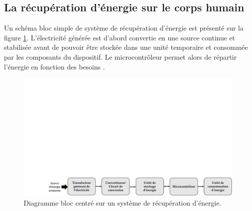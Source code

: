 	\subsection{La récupération d'énergie sur le corps humain}
	\label{subsec:1.3.3_La recuperation d energie sur le corps humain}
Un schéma bloc simple de système de récupération d'énergie est présenté sur la figure \ref{fig:diagramme_bloc_recuperateur}. L'électricité générée est d'abord convertie en une source continue et stabilisée avant de pouvoir être stockée dans une unité temporaire et consommée par les composants du dispositif. Le microcontrôleur permet alors de répartir l'énergie en fonction des besoins \cite{Kumari2020}.
\begin{figure}[!htbp]
	\begin{center}
		\captionsetup{justification=centering}
		\includegraphics[trim={4cm 0cm 0cm 16cm},clip, width=\textwidth]{../Chap1/Figure/diagramme_bloc_recuperateur.pdf}
		\caption{Diagramme bloc centré sur un système de récupération d'énergie.}
		\label{fig:diagramme_bloc_recuperateur}
	\end{center}
\end{figure}

